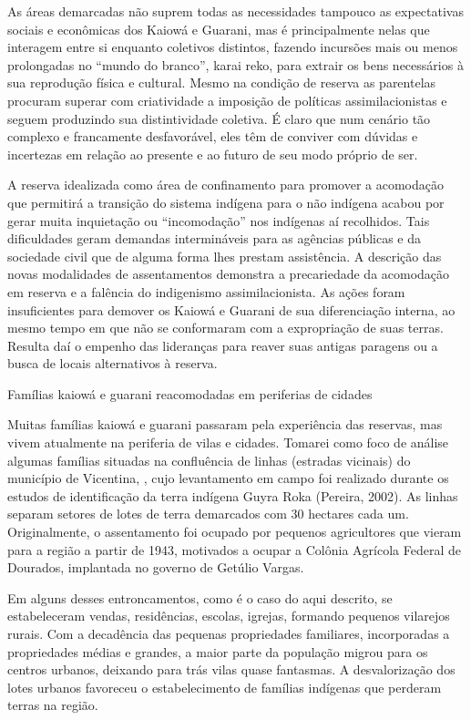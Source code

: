 {{As áreas demarcadas não suprem todas as necessidades tampouco as
expectativas sociais e econômicas dos Kaiowá e Guarani, mas é
principalmente nelas que interagem entre si enquanto coletivos
distintos, fazendo incursões mais ou menos prolongadas no ``mundo do
branco'', karai reko, para extrair os bens necessários à sua reprodução
física e cultural. Mesmo na condição de reserva as parentelas procuram
superar com criatividade a imposição de políticas assimilacionistas e
seguem produzindo sua distintividade coletiva. É claro que num cenário
tão complexo e francamente desfavorável, eles têm de conviver com
dúvidas e incertezas em relação ao presente e ao futuro de seu modo
próprio de ser. 

A reserva idealizada como área de confinamento para promover a
acomodação que permitirá a transição do sistema indígena para o não
indígena acabou por gerar muita inquietação ou ``incomodação'' nos
indígenas aí recolhidos. Tais dificuldades geram demandas intermináveis
para as agências públicas e da sociedade civil que de alguma forma lhes
prestam assistência. A descrição das novas modalidades de assentamentos
demonstra a precariedade da acomodação em reserva e a falência do
indigenismo assimilacionista. As ações foram insuficientes para demover
os Kaiowá e Guarani de sua diferenciação interna, ao mesmo tempo em que
não se conformaram com a expropriação de suas terras. Resulta daí o
empenho das lideranças para reaver suas antigas paragens ou a busca de
locais alternativos à reserva.

Famílias kaiowá e guarani reacomodadas em periferias de cidades

Muitas famílias kaiowá e guarani passaram pela experiência das reservas,
mas vivem atualmente na periferia de vilas e cidades. Tomarei como foco
de análise algumas famílias situadas na confluência de linhas (estradas
vicinais) do município de Vicentina, , cujo levantamento em campo foi
realizado durante os estudos de identificação da terra indígena Guyra
Roka (Pereira, 2002). As linhas separam setores de lotes de terra
demarcados com 30 hectares cada um. Originalmente, o assentamento foi
ocupado por pequenos agricultores que vieram para a região a partir de
1943, motivados a ocupar a Colônia Agrícola Federal de Dourados,
implantada no governo de Getúlio Vargas.

Em alguns desses entroncamentos, como é o caso do aqui descrito, se
estabeleceram vendas, residências, escolas, igrejas, formando pequenos
vilarejos rurais. Com a decadência das pequenas propriedades
familiares, incorporadas a propriedades médias e grandes, a maior parte
da população migrou para os centros urbanos, deixando para trás vilas
quase fantasmas. A desvalorização dos lotes urbanos favoreceu o
estabelecimento de famílias indígenas que perderam terras na região.

}}
